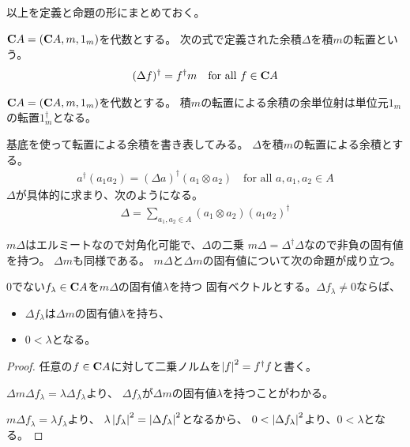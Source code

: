 	以上を定義と命題の形にまとめておく。

	\begin{definition}[積の転置]\label{def:積の転置} %
		${\mathbf{C}}A=({\mathbf{C}}A,m,1_m)$を代数とする。
		次の式で定義された余積$\Delta$を積$m$の転置という。
		\begin{equation*}\begin{split} %
			(\Delta f)^\dag = f^\dag m \quad\text{for all }f\in\mybf{C}A
		\end{split}\end{equation*} %
	\end{definition} %

	\begin{proposition}[単位元の転置]\label{prop:単位元の転置} %
		${\mathbf{C}}A=({\mathbf{C}}A,m,1_m)$を代数とする。
		積$m$の転置による余積の余単位射は単位元$1_m$の転置$1_m^\dag$となる。
	\end{proposition} %

	基底を使って転置による余積を書き表してみる。
	$\Delta$を積$m$の転置による余積とする。
	\begin{equation*}\begin{split} %
		a^\dag(a_1a_2) = (\Delta a)^\dag(a_1\otimes a_2)
		\quad\text{for all }a,a_1,a_2\in A
	\end{split}\end{equation*} %
	$\Delta$が具体的に求まり、次のようになる。
	\begin{equation*}\begin{split} %
		\Delta = \sum_{a_1,a_2\in A}(a_1\otimes a_2)(a_1a_2)^\dag
	\end{split}\end{equation*} %

	$m\Delta$はエルミートなので対角化可能で、$\Delta$の二乗
	$m\Delta=\Delta^\dag \Delta$なので非負の固有値を持つ。
	$\Delta m$も同様である。
	$m\Delta$と$\Delta m$の固有値について次の命題が成り立つ。

	\begin{proposition}[非ゼロ固有値の対応]\label{prop:非ゼロ固有値の対応} %
		$0$でない$f_\lambda\in{\mathbf{C}}A$を$m\Delta$の固有値$\lambda$を持つ
		固有ベクトルとする。$\Delta f_\lambda\neq0$ならば、
		\begin{itemize}\setlength{\itemsep}{-1mm} %
			\item $\Delta f_\lambda$は$\Delta m$の固有値$\lambda$を持ち、
			\item $0<\lambda$となる。
		\end{itemize} %
	\end{proposition} %
	\begin{proof} %
		任意の$f\in{\mathbf{C}}A$に対して二乗ノルムを$\left|{f}\right|^2=f^\dag f$と書く。

		$\Delta m\Delta f_\lambda=\lambda\Delta f_\lambda$より、
		$\Delta f_\lambda$が$\Delta m$の固有値$\lambda$を持つことがわかる。

		$m\Delta f_\lambda=\lambda f_\lambda$より、
		$\lambda\left|{f_\lambda}\right|^2=\left|{\Delta f_\lambda}\right|^2$となるから、
		$0<\left|{\Delta f_\lambda}\right|^2$より、$0<\lambda$となる。
	\end{proof} %

